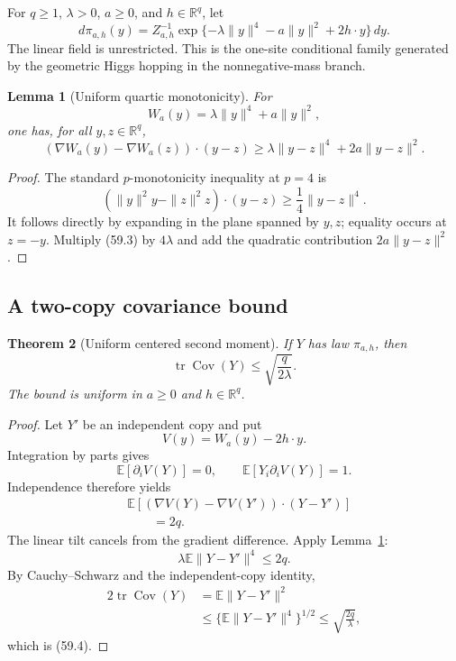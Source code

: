 \documentclass[11pt]{article}
\newtheorem{theorem}{Theorem}[section]
\newtheorem{lemma}[theorem]{Lemma}
\theoremstyle{remark}
\begin{document}
For \(q\geq1\), \(\lambda>0\), \(a\geq0\), and
\(h\in\mathbb R^q\), let
\[
 d\pi_{a,h}(y)
 =
 Z_{a,h}^{-1}
 \exp\{-\lambda\|y\|^4-a\|y\|^2+2h\cdot y\}\,dy. \tag{59.1}
\]
The linear field is unrestricted.  This is the one-site conditional
family generated by the geometric Higgs hopping in the
nonnegative-mass branch.

\begin{lemma}[Uniform quartic monotonicity]
\label{lem:v17v59-monotone}
For
\[
 W_a(y)=\lambda\|y\|^4+a\|y\|^2,
\]
one has, for all \(y,z\in\mathbb R^q\),
\[
\boxed{
 (\nabla W_a(y)-\nabla W_a(z))\cdot(y-z)
 \geq
 \lambda\|y-z\|^4+2a\|y-z\|^2.}                  \tag{59.2}
\]
\end{lemma}

\begin{proof}
The standard \(p\)-monotonicity inequality at \(p=4\) is
\[
 (\|y\|^2y-\|z\|^2z)\cdot(y-z)
 \geq\frac14\|y-z\|^4.                            \tag{59.3}
\]
It follows directly by expanding in the plane spanned by \(y,z\);
equality occurs at \(z=-y\).  Multiply (59.3) by \(4\lambda\) and add
the quadratic contribution \(2a\|y-z\|^2\).
\end{proof}

\subsection{A two-copy covariance bound}

\begin{theorem}[Uniform centered second moment]
\label{thm:v17v59-covariance}
If \(Y\) has law \(\pi_{a,h}\), then
\[
\boxed{
 \operatorname{tr}\operatorname{Cov}(Y)
 \leq
 \sqrt{\frac{q}{2\lambda}}.}                      \tag{59.4}
\]
The bound is uniform in \(a\geq0\) and \(h\in\mathbb R^q\).
\end{theorem}

\begin{proof}
Let \(Y'\) be an independent copy and put
\[
 V(y)=W_a(y)-2h\cdot y.
\]
Integration by parts gives
\[
 \mathbb E[\partial_iV(Y)]=0,\qquad
 \mathbb E[Y_i\partial_iV(Y)]=1.                 \tag{59.5}
\]
Independence therefore yields
\[
\begin{aligned}
 &\mathbb E[
 (\nabla V(Y)-\nabla V(Y'))\cdot(Y-Y')]\\
 &\qquad=2q.                                      \tag{59.6}
\end{aligned}
\]
The linear tilt cancels from the gradient difference.  Apply
Lemma~\ref{lem:v17v59-monotone}:
\[
 \lambda\mathbb E\|Y-Y'\|^4\leq2q.                \tag{59.7}
\]
By Cauchy--Schwarz and the independent-copy identity,
\[
\begin{aligned}
 2\operatorname{tr}\operatorname{Cov}(Y)
 &=\mathbb E\|Y-Y'\|^2\\
 &\leq
 \{\mathbb E\|Y-Y'\|^4\}^{1/2}
 \leq\sqrt{\frac{2q}{\lambda}},
\end{aligned}
\]
which is (59.4).
\end{proof}
\end{document}
